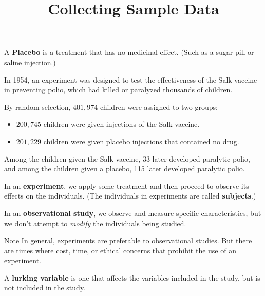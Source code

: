 \documentclass{beamer}
\title[MA205 - Section 1.3]{Collecting Sample Data}
\begin{document}
\begin{frame}
\titlepage
\end{frame}

\begin{frame}
\begin{definition}
A \textbf{Placebo} is a treatment that has no medicinal effect. (Such as a sugar pill or saline injection.)
\end{definition}\pause

\begin{example}
In 1954, an experiment was designed to test the effectiveness of the Salk vaccine in preventing polio, which had killed or paralyzed thousands of children.\pause

By random selection, $401, 974$ children were assigned to two groups:
\begin{itemize}
\item $200,745$ children were given injections of the Salk vaccine.
\item $201,229$ children were given placebo injections that contained no drug.
\end{itemize}\pause

Among the children given the Salk vaccine, 33 later developed paralytic polio, and among the children given a placebo, 115 later developed paralytic polio.
\end{example}
\end{frame}

\begin{frame}
\begin{definition}
In an \textbf{experiment}, we apply some treatment and then proceed to observe its effects on the individuals. (The individuals in experiments are called \textbf{subjects}.)
\end{definition}\pause

\begin{definition}
In an \textbf{observational study}, we observe and measure specific characteristics, but we don't attempt to \emph{modify} the individuals being studied.
\end{definition}\pause

\begin{block}{Note}
In general, experiments are preferable to observational studies. But there are times where cost, time, or ethical concerns that prohibit the use of an experiment.
\end{block}\pause

\begin{definition}
A \textbf{lurking variable} is one that affects the variables included in the study, but is not included in the study.
\end{definition}
\end{frame}
\end{document}

